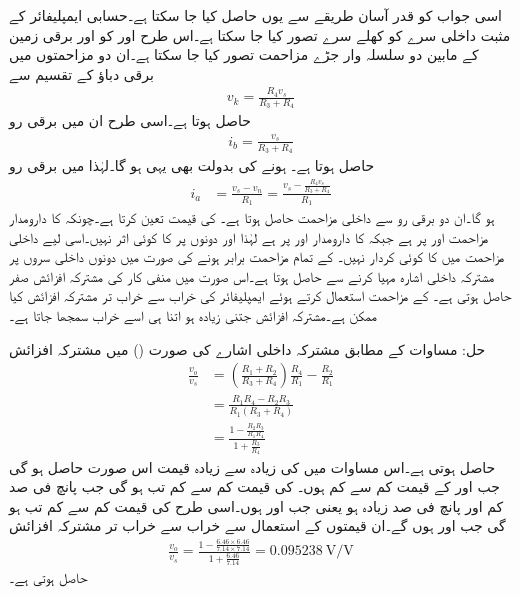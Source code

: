 اسی جواب کو قدر آسان طریقے سے یوں حاصل کیا جا سکتا ہے۔حسابی ایمپلیفائر کے مثبت داخلی سرے  کو کھلے سرے تصور کیا جا سکتا ہے۔اس طرح  اور  کو  اور برقی زمین کے مابین دو سلسلہ وار جڑے مزاحمت تصور کیا جا سکتا ہے۔ان دو مزاحمتوں میں برقی دباؤ کے تقسیم سے
\begin{align*}
v_k=\frac{R_4 v_s}{R_3+R_4}
\end{align*}
حاصل ہوتا ہے۔اسی طرح ان میں برقی رو
\begin{align*}
i_b=\frac{v_s}{R_3+R_4}
\end{align*}
حاصل ہوتا ہے۔ ہونے کی بدولت  بھی یہی ہو گا۔لہٰذا  میں برقی رو
\begin{align*}
i_a&=\frac{v_s-v_n}{R_1}=\frac{v_s-\frac{R_4 v_s}{R_3+R_4}}{R_1}
\end{align*}
ہو گا۔ان دو برقی رو سے داخلی مزاحمت حاصل ہوتا ہے۔ کی قیمت  تعین کرتا ہے۔چونکہ  کا دارومدار مزاحمت  اور  پر ہے  جبکہ  کا دارومدار  اور  پر ہے لہٰذا  اور  دونوں پر  کا کوئی اثر نہیں۔اسی لیے داخلی مزاحمت میں  کا کوئی کردار نہیں۔
 
 کے تمام مزاحمت برابر ہونے کی صورت میں دونوں داخلی سروں  پر مشترکہ داخلی اشارہ  مہیا کرنے سے  حاصل ہوتا ہے۔اس صورت میں منفی کار کی مشترکہ افزائش صفر حاصل ہوتی ہے۔ کے مزاحمت استعمال کرتے ہوئے ایمپلیفائر کی خراب سے خراب تر مشترکہ افزائش کیا ممکن ہے۔مشترکہ افزائش جتنی زیادہ ہو اتنا ہی اسے خراب سمجھا جاتا ہے۔ 

حل:
مساوات  کے مطابق مشترکہ داخلی اشارے کی صورت () میں  مشترکہ افزائش
\begin{align*}
\frac{v_o}{v_s}&=\left(\frac{R_1+R_2}{R_3+R_4} \right) \frac{R_4}{R_1}-\frac{R_2}{R_1}\\
&=\frac{R_1 R_4-R_2R_3}{R_1 \left(R_3+R_4 \right)}\\
&=\frac{1-\frac{R_2R_3}{R_1 R_4}}{1+\frac{R_3}{R_4}}
\end{align*}
حاصل ہوتی ہے۔اس مساوات میں  کی زیادہ سے زیادہ قیمت اس صورت حاصل ہو گی جب  اور    کے قیمت کم سے کم ہوں۔ کی قیمت کم سے کم تب ہو گی جب  پانچ فی صد کم اور  پانچ فی صد زیادہ ہو یعنی جب  اور  ہوں۔اسی طرح  کی قیمت کم سے کم تب ہو گی جب  اور  ہوں گے۔ان قیمتوں کے استعمال سے خراب سے خراب تر مشترکہ افزائش
\begin{align*}
\frac{v_o}{v_s}=\frac{1-\frac{6.46 \times 6.46}{7.14 \times 7.14}}{1+\frac{6.46}{7.14}}=\SI{0.095238}{\volt \per \volt}
\end{align*}
حاصل ہوتی ہے۔

